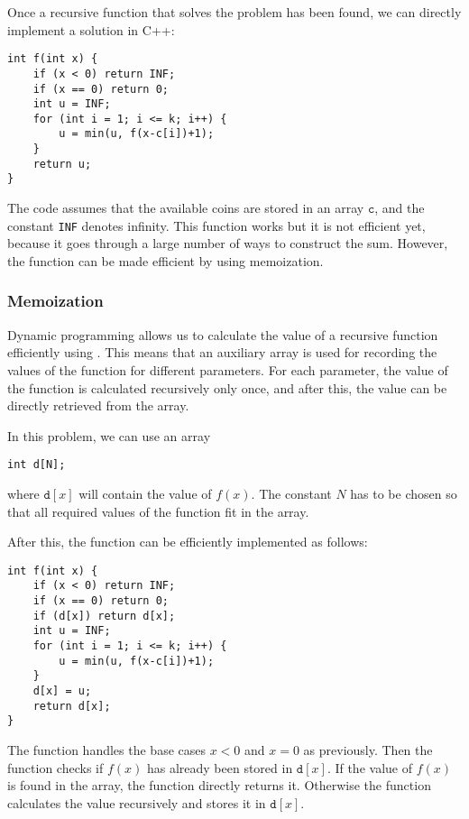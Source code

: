 Once a recursive function that solves the problem
has been found,
we can directly implement a solution in C++:

\begin{lstlisting}
int f(int x) {
    if (x < 0) return INF;
    if (x == 0) return 0;
    int u = INF;
    for (int i = 1; i <= k; i++) {
        u = min(u, f(x-c[i])+1);
    }
    return u;
}
\end{lstlisting}

The code assumes that the available coins are
stored in an array $\texttt{c}$,
and the constant \texttt{INF} denotes infinity.
This function works but it is not efficient yet,
because it goes through a large number
of ways to construct the sum.
However, the function can be made efficient by
using memoization.

\subsubsection{Memoization}


Dynamic programming allows us to calculate the
value of a recursive function efficiently
using .
This means that an auxiliary array is used
for recording the values of the function
for different parameters.
For each parameter, the value of the function
is calculated recursively only once, and after this,
the value can be directly retrieved from the array.

In this problem, we can use an array
\begin{lstlisting}
int d[N];
\end{lstlisting}

where $\texttt{d}[x]$ will contain
the value of $f(x)$.
The constant $N$ has to be chosen so
that all required values of the function fit
in the array.

After this, the function can be efficiently
implemented as follows:

\begin{lstlisting}
int f(int x) {
    if (x < 0) return INF;
    if (x == 0) return 0;
    if (d[x]) return d[x];
    int u = INF;
    for (int i = 1; i <= k; i++) {
        u = min(u, f(x-c[i])+1);
    }
    d[x] = u;
    return d[x];
}
\end{lstlisting}

The function handles the base cases
$x<0$ and $x=0$ as previously.
Then the function checks if
$f(x)$ has already been stored
in $\texttt{d}[x]$.
If the value of $f(x)$ is found in the array,
the function directly returns it.
Otherwise the function calculates the value
recursively and stores it in $\texttt{d}[x]$.

